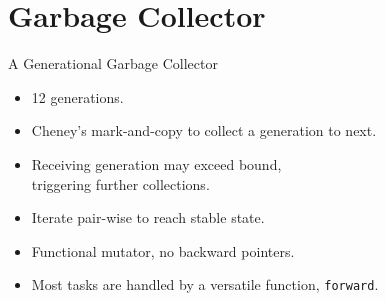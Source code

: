 \documentclass[professionalfonts, xcolor=table]{beamer}
\begin{document}
\section{Garbage Collector}

\begin{frame}{A Generational Garbage Collector}
  \begin{itemize}
  \item 12 generations.
  \item Cheney's mark-and-copy to collect a generation to next.
  \item Receiving generation may exceed bound,\\ triggering further
    collections.
  \item Iterate pair-wise to reach stable state.
  \item Functional mutator, no backward pointers.
  \item Most tasks are handled by a versatile function, \texttt{forward}.
  \end{itemize}
\end{frame}
\end{document}
